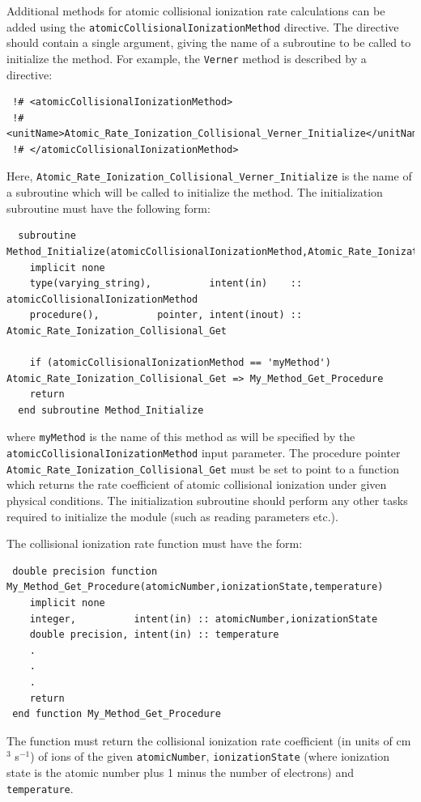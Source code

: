 Additional methods for atomic collisional ionization rate calculations can be added using the {\tt atomicCollisionalIonizationMethod} directive. The directive should contain a single argument, giving the name of a subroutine to be called to initialize the method. For example, the {\tt Verner} method is described by a directive:
\begin{verbatim}
 !# <atomicCollisionalIonizationMethod>
 !#  <unitName>Atomic_Rate_Ionization_Collisional_Verner_Initialize</unitName>
 !# </atomicCollisionalIonizationMethod>
\end{verbatim}
Here, {\tt Atomic\_Rate\_Ionization\_Collisional\_Verner\_Initialize} is the name of a subroutine which will be called to initialize the method. The initialization subroutine must have the following form:
\begin{verbatim}
  subroutine Method_Initialize(atomicCollisionalIonizationMethod,Atomic_Rate_Ionization_Collisional_Get)
    implicit none
    type(varying_string),          intent(in)    :: atomicCollisionalIonizationMethod
    procedure(),          pointer, intent(inout) :: Atomic_Rate_Ionization_Collisional_Get
    
    if (atomicCollisionalIonizationMethod == 'myMethod') Atomic_Rate_Ionization_Collisional_Get => My_Method_Get_Procedure
    return
  end subroutine Method_Initialize
\end{verbatim}
where {\tt myMethod} is the name of this method as will be specified by the {\tt atomicCollisionalIonizationMethod} input parameter. The procedure pointer {\tt Atomic\_Rate\_Ionization\_Collisional\_Get} must be set to point to a function which returns the rate coefficient of atomic collisional ionization under given physical conditions. The initialization subroutine should perform any other tasks required to initialize the module (such as reading parameters etc.).

The collisional ionization rate function must have the form:
\begin{verbatim}
 double precision function My_Method_Get_Procedure(atomicNumber,ionizationState,temperature)
    implicit none
    integer,          intent(in) :: atomicNumber,ionizationState
    double precision, intent(in) :: temperature
    .
    .
    .
    return
 end function My_Method_Get_Procedure
\end{verbatim}
The function must return the collisional ionization rate coefficient (in units of cm$^3$ s$^{-1}$) of ions of the given {\tt atomicNumber}, {\tt ionizationState} (where ionization state is the atomic number plus 1 minus the number of electrons) and {\tt temperature}.

